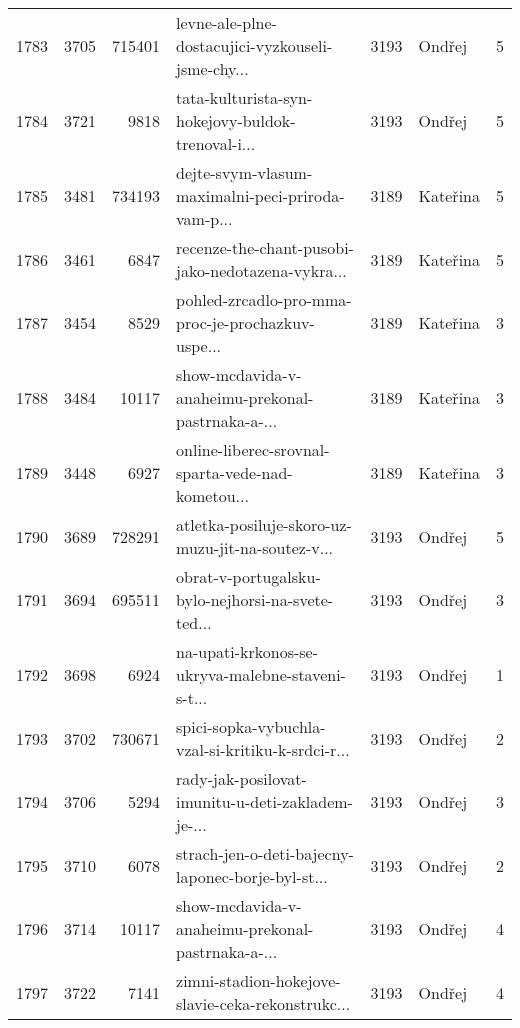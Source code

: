 \begin{tabular}{lrrlrlr}
1783 &       3705 &   715401 &  levne-ale-plne-dostacujici-vyzkouseli-jsme-chy... &     3193 &                       Ondřej &               5 \\
1784 &       3721 &     9818 &  tata-kulturista-syn-hokejovy-buldok-trenoval-i... &     3193 &                       Ondřej &               5 \\
1785 &       3481 &   734193 &  dejte-svym-vlasum-maximalni-peci-priroda-vam-p... &     3189 &                     Kateřina &               5 \\
1786 &       3461 &     6847 &  recenze-the-chant-pusobi-jako-nedotazena-vykra... &     3189 &                     Kateřina &               5 \\
1787 &       3454 &     8529 &  pohled-zrcadlo-pro-mma-proc-je-prochazkuv-uspe... &     3189 &                     Kateřina &               3 \\
1788 &       3484 &    10117 &  show-mcdavida-v-anaheimu-prekonal-pastrnaka-a-... &     3189 &                     Kateřina &               3 \\
1789 &       3448 &     6927 &  online-liberec-srovnal-sparta-vede-nad-kometou... &     3189 &                     Kateřina &               3 \\
1790 &       3689 &   728291 &  atletka-posiluje-skoro-uz-muzu-jit-na-soutez-v... &     3193 &                       Ondřej &               5 \\
1791 &       3694 &   695511 &  obrat-v-portugalsku-bylo-nejhorsi-na-svete-ted... &     3193 &                       Ondřej &               3 \\
1792 &       3698 &     6924 &  na-upati-krkonos-se-ukryva-malebne-staveni-s-t... &     3193 &                       Ondřej &               1 \\
1793 &       3702 &   730671 &  spici-sopka-vybuchla-vzal-si-kritiku-k-srdci-r... &     3193 &                       Ondřej &               2 \\
1794 &       3706 &     5294 &  rady-jak-posilovat-imunitu-u-deti-zakladem-je-... &     3193 &                       Ondřej &               3 \\
1795 &       3710 &     6078 &  strach-jen-o-deti-bajecny-laponec-borje-byl-st... &     3193 &                       Ondřej &               2 \\
1796 &       3714 &    10117 &  show-mcdavida-v-anaheimu-prekonal-pastrnaka-a-... &     3193 &                       Ondřej &               4 \\
1797 &       3722 &     7141 &  zimni-stadion-hokejove-slavie-ceka-rekonstrukc... &     3193 &                       Ondřej &               4 \\

\end{tabular}
